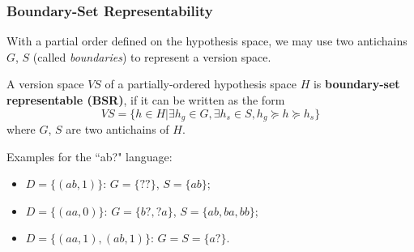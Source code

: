 \documentclass{beamer}
\begin{document}
\begin{frame}
\begin{itemize}
\begin{figure}[h]
		
	\end{figure}
	
	\end{itemize}

\end{frame}

\begin{frame}
\frametitle{Boundary-Set Representability}
With a partial order defined on the hypothesis space, we may use two antichains $G$, $S$ (called \textit{boundaries}) to represent a version space.

\begin{definition}
	A version space $VS$ of a partially-ordered hypothesis space $H$ is \textbf{boundary-set representable (BSR)}, if it can be written as the form
	$$
	VS = \{h \in H | \exists h_g \in G, \exists h_s \in S, h_g \succeq h \succeq h_s \}
	$$
	where $G$, $S$ are two antichains of $H$.
\end{definition}

\pause

Examples for the ``ab?" language: 
\begin{itemize}
	\item $D = \{(ab, 1)\}$: $G = \{??\}$, $S = \{ab\}$;
	\item $D = \{(aa, 0)\}$: $G = \{b?, ?a\}$, $S = \{ab, ba, bb\}$;
	\item $D = \{(aa, 1), (ab, 1)\}$: $G = S = \{a?\}$.
\end{itemize}

\end{frame}
\end{document}
